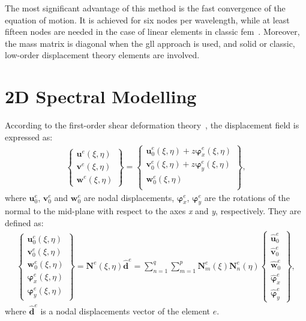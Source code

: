 \documentclass[11pt,a4paper,final]{report}
\begin{document}
The most significant advantage of this method is the fast convergence of the equation of motion.
It is achieved for six nodes per wavelength, while at least fifteen nodes are needed in the case of linear elements in classic \ac{fem}~\cite{wee2017simulating}.
Moreover, the mass matrix is diagonal when the \ac{gll} approach is used, and solid or classic, low-order displacement theory elements are involved.
 \section{2D Spectral Modelling}
\label{sec:2Dmodel}



According to the first-order shear deformation theory~\cite{reissner1945effect, mindlin1951influence}, the displacement field is expressed as:
\begin{eqnarray}
	\left \{ \begin{array}{c}
		\textbf{u}^e(\xi,\eta) \\
		\textbf{v}^e(\xi,\eta) \\
		\textbf{w}^e(\xi,\eta)
	\end{array} \right\} = 
	\left \{ \begin{array}{c}
		\textbf{u}_0^e(\xi,\eta) + z\boldsymbol{\varphi}_x^e(\xi,\eta)\\
		\textbf{v}_0^e(\xi,\eta) + z\boldsymbol{\varphi}_y^e(\xi,\eta)\\
		\textbf{w}_0^e(\xi,\eta) \\
	\end{array} \right\},
\end{eqnarray}
where \(\textbf{u}_0^e\), \(\textbf{v}_0^e\) and \(\textbf{w}_0^e\) are nodal displacements, \(\boldsymbol{\varphi}_x^e\), \(\boldsymbol{\varphi}_y^e\) are the rotations of the normal to the mid-plane with respect to the axes \textit{x} and \textit{y}, respectively. They are defined as:
\begin{eqnarray}
	\left \{\begin{array}{c}
		\textbf{u}_0^e(\xi,\eta) \\
		\textbf{v}_0^e(\xi,\eta) \\
		\textbf{w}_0^e(\xi,\eta) \\
		\boldsymbol{\varphi}_x^e(\xi,\eta) \\
		\boldsymbol{\varphi}_y^e(\xi,\eta)
	\end{array} \right\}
	= \textbf{N}^e(\xi,\eta)\widehat{\textbf{d}}^e
	= \sum_{n=1}^q\sum_{m=1}^p\textbf{N}_m^e(\xi)\textbf{N}_n^e(\eta)
	\left \{ \begin{array}{c}
		\widehat{\textbf{u}}_0^e \\
		\widehat{\textbf{v}}_0^e \\
		\widehat{\textbf{w}}_0^e \\
		\widehat{\boldsymbol{\varphi}}_x^e \\
		\widehat{\boldsymbol{\varphi}}_y^e
	\end{array} \right \},
\end{eqnarray}
where $\widehat{\textbf{d}}^e$ is a nodal displacements vector of the element $e$.
\end{document}
